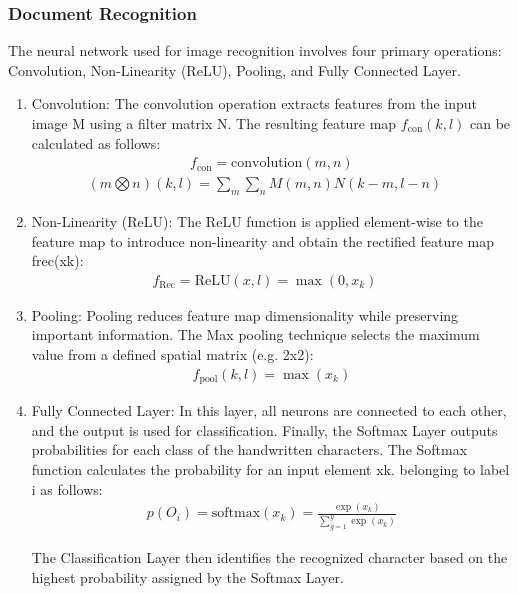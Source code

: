 \subsubsection{Document Recognition} 
The neural network used for image recognition involves four primary operations: Convolution, Non-Linearity (ReLU), Pooling, and Fully Connected Layer.
\begin{enumerate}
    
    \item Convolution: The convolution operation extracts features from the input image M using a filter matrix N. The resulting feature map \( f_{\text{con}}(k,l)\) can be calculated as follows:
    \begin{eqnarray}
        f_{\text{con}} = \text{convolution}(m,n) 
    \end{eqnarray}
     \begin{eqnarray}
         (m\bigotimes n)(k,l) = \sum_{m} \sum_{n}    M(m,n)  N(k-m,l-n) \quad
     \end{eqnarray}   
        
    
    
    
    \item Non-Linearity (ReLU): The ReLU function is applied element-wise to the feature map to introduce non-linearity and obtain the rectified feature map frec(xk): 
    \begin{eqnarray}
    f_{\text{Rec}} = \text{ReLU}(x,l) = \max(0, x_k)  \quad
    \end{eqnarray}   

    \item Pooling: Pooling reduces feature map dimensionality while preserving important information. The Max pooling technique selects the maximum value from a defined spatial matrix (e.g. 2x2):
    \begin{eqnarray}
    f_{\text{pool}}(k,l) = \max(x_k)
    \end{eqnarray}   

    \item Fully Connected Layer: In this layer, all neurons are connected to each other, and the output is used for classification.\newline
    Finally, the Softmax Layer outputs probabilities for each class of the handwritten characters. The Softmax function calculates the probability for an input element xk. belonging to label i as follows:
    \begin{eqnarray}
        p(O_i) = \text{softmax}(x_k) = \frac{\exp(x_k)}{\sum_{g = 1}^{y}   \exp(x_k)} 
    \end{eqnarray}
    
    The Classification Layer then identifies the recognized character based on the highest probability assigned by the Softmax Layer.
\end{enumerate}
